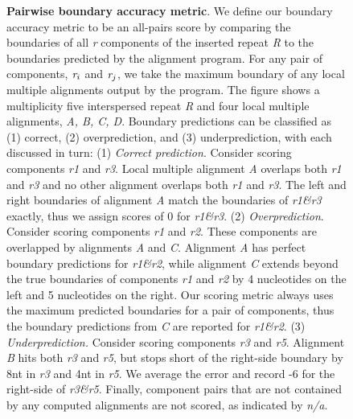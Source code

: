 \documentclass{llncs}
\begin{document}
\begin{figure}[t]
\centering
{}
\caption{\scriptsize \textbf{Pairwise boundary accuracy metric}. We define our boundary accuracy metric to be an all-pairs score by comparing the boundaries of all \emph{r} components of the inserted repeat \emph{R} to the boundaries predicted by the alignment program. For any pair of components, $\emph{r}_{i}$ and $\emph{r}_{j}$, we take the maximum boundary of any local multiple alignments output by the program. The figure shows a multiplicity five interspersed repeat \emph{R} and four local multiple alignments, \emph{A, B, C, D}.  Boundary predictions can be classified as (1) correct, (2) overprediction, and (3) underprediction, with each discussed in turn: (1) \emph{Correct prediction}. Consider scoring components \emph{r1} and \emph{r3}.  Local multiple alignment \emph{A} overlaps both \emph{r1} and \emph{r3} and no other alignment overlaps both \emph{r1} and \emph{r3}.  The left and right boundaries of alignment \emph{A} match the boundaries of \emph{r1\&r3} exactly, thus we assign scores of 0 for \emph{r1\&r3}.  (2) \emph{Overprediction}. Consider scoring components \emph{r1} and \emph{r2}.  These components are overlapped by alignments \emph{A} and \emph{C}.  Alignment \emph{A} has perfect boundary predictions for \emph{r1\&r2}, while alignment \emph{C} extends beyond the true boundaries of components \emph{r1} and \emph{r2} by 4 nucleotides on the left and 5 nucleotides on the right.  Our scoring metric always uses the maximum predicted boundaries for a pair of components, thus the boundary predictions from \emph{C} are reported for \emph{r1\&r2}. (3) \emph{Underprediction.}  Consider scoring components \emph{r3} and \emph{r5}.  Alignment \emph{B} hits both \emph{r3} and \emph{r5}, but stops short of the right-side boundary by 8nt in \emph{r3} and 4nt in \emph{r5}.  We average the error and record -6 for the right-side of \emph{r3\&r5}.
Finally, component pairs that are not contained by any computed alignments are not scored, as indicated by \emph{n/a}.}
\label{fig-overunder}\vspace{-0.2cm}
\end{figure}
\end{document}
